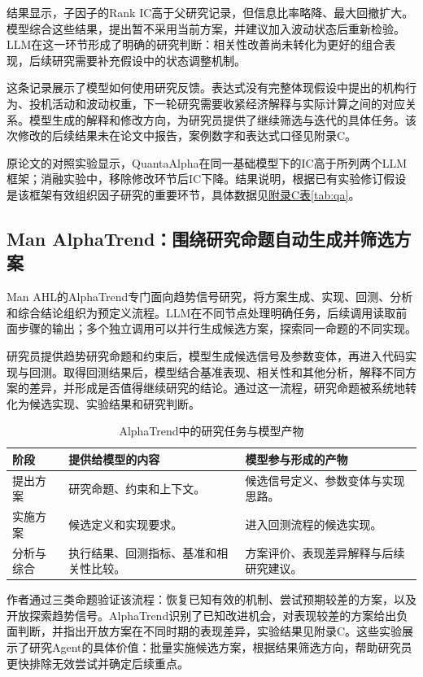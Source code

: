 \documentclass[11pt,a4paper,fontset=none]{ctexart}
\begin{document}
结果显示，子因子的Rank IC高于父研究记录，但信息比率略降、最大回撤扩大。模型综合这些结果，提出暂不采用当前方案，并建议加入波动状态后重新检验。LLM在这一环节形成了明确的研究判断：相关性改善尚未转化为更好的组合表现，后续研究需要补充假设中的状态调整机制。

这条记录展示了模型如何使用研究反馈。表达式没有完整体现假设中提出的机构行为、投机活动和波动权重，下一轮研究需要收紧经济解释与实际计算之间的对应关系。模型生成的解释和修改方向，为研究员提供了继续筛选与迭代的具体任务。该次修改的后续结果未在论文中报告，案例数字和表达式口径见附录C。

原论文的对照实验显示，QuantaAlpha在同一基础模型下的IC高于所列两个LLM框架；消融实验中，移除修改环节后IC下降。结果说明，根据已有实验修订假设是该框架有效组织因子研究的重要环节，具体数据见\hyperref[tab:qa]{附录C表\ref*{tab:qa}}。

\subsection{Man AlphaTrend：围绕研究命题自动生成并筛选方案}
Man AHL的AlphaTrend专门面向趋势信号研究，将方案生成、实现、回测、分析和综合结论组织为预定义流程。LLM在不同节点处理明确任务，后续调用读取前面步骤的输出；多个独立调用可以并行生成候选方案，探索同一命题的不同实现。

研究员提供趋势研究命题和约束后，模型生成候选信号及参数变体，再进入代码实现与回测。取得回测结果后，模型结合基准表现、相关性和其他分析，解释不同方案的差异，并形成是否值得继续研究的结论。通过这一流程，研究命题被系统地转化为候选实现、实验结果和研究判断。

\begin{table}[H]\small\centering
\caption{AlphaTrend中的研究任务与模型产物}
\begin{tabularx}{\linewidth}{@{}P{27mm}Y Y@{}}\toprule
阶段 & 提供给模型的内容 & 模型参与形成的产物\\\midrule
提出方案 & 研究命题、约束和上下文。 & 候选信号定义、参数变体与实现思路。\\
实施方案 & 候选定义和实现要求。 & 进入回测流程的候选实现。\\
分析与综合 & 执行结果、回测指标、基准和相关性比较。 & 方案评价、表现差异解释与后续研究建议。\\\bottomrule
\end{tabularx}
\end{table}

作者通过三类命题验证该流程：恢复已知有效的机制、尝试预期较差的方案，以及开放探索趋势信号。AlphaTrend识别了已知改进机会，对表现较差的方案给出负面判断，并指出开放方案在不同时期的表现差异，实验结果见附录C。这些实验展示了研究Agent的具体价值：批量实施候选方案，根据结果筛选方向，帮助研究员更快排除无效尝试并确定后续重点。
\end{document}
